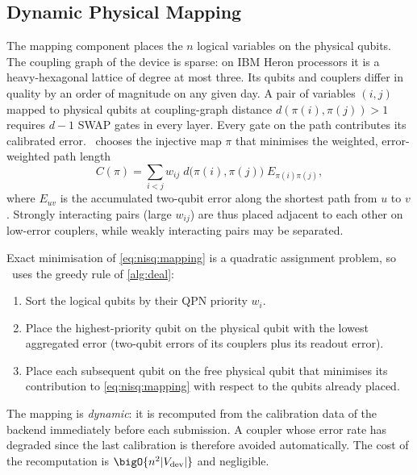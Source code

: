 \subsection{Dynamic Physical Mapping}\label{sec:nisq:mapping}

The mapping component places the $n$ logical variables on the physical qubits. The coupling graph of the device is sparse: on IBM Heron processors it is a heavy-hexagonal lattice of degree at most three. Its qubits and couplers differ in quality by an order of magnitude on any given day. A pair of variables $(i,j)$ mapped to physical qubits at coupling-graph distance $d(\pi(i),\pi(j))>1$ requires $d-1$ SWAP gates in every layer. Every gate on the path contributes its calibrated error. \deal\ chooses the injective map $\pi$ that minimises the weighted, error-weighted path length
\begin{equation}\label{eq:nisq:mapping}
  C(\pi) = \sum_{i<j} w_{ij}\; d\bigl(\pi(i),\pi(j)\bigr)\; E_{\pi(i)\pi(j)},
\end{equation}
where $E_{uv}$ is the accumulated two-qubit error along the shortest path from $u$ to $v$. Strongly interacting pairs (large $w_{ij}$) are thus placed adjacent to each other on low-error couplers, while weakly interacting pairs may be separated.

Exact minimisation of \cref{eq:nisq:mapping} is a quadratic assignment problem, so \deal\ uses the greedy rule of \cref{alg:deal}:
\begin{enumerate}
\item Sort the logical qubits by their QPN priority $w_{i}$.
\item Place the highest-priority qubit on the physical qubit with the lowest aggregated error (two-qubit errors of its couplers plus its readout error).
\item Place each subsequent qubit on the free physical qubit that minimises its contribution to \cref{eq:nisq:mapping} with respect to the qubits already placed.
\end{enumerate}
The mapping is \emph{dynamic}: it is recomputed from the calibration data of the backend immediately before each submission. A coupler whose error rate has degraded since the last calibration is therefore avoided automatically. The cost of the recomputation is $\bigO{n^{2}\lvert V_{\mathrm{dev}}\rvert}$ and negligible.

